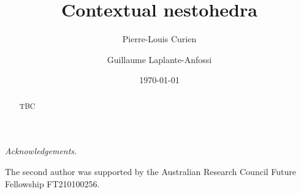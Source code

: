 \documentclass[11pt]{amsart}
\title{Contextual nestohedra}
\author{Pierre-Louis Curien}
\author{Guillaume Laplante-Anfossi}
\date{\today}
\begin{document}
\begin{abstract}
TBC
\end{abstract}

\maketitle

\setcounter{tocdepth}{1}






\bigskip

\emph{Acknowledgements.}   

The second author was supported by the Australian Research Council Future Fellowship FT210100256.




\end{document}
